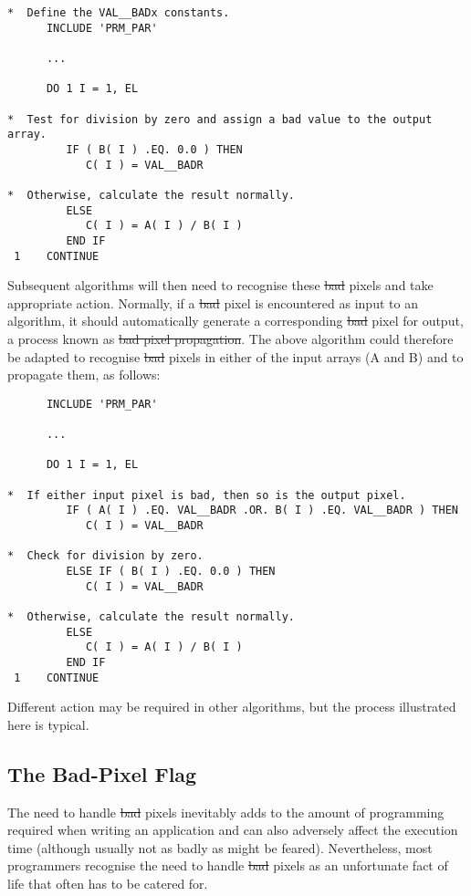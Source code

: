 \small
\begin{verbatim}
*  Define the VAL__BADx constants.
      INCLUDE 'PRM_PAR'

      ...

      DO 1 I = 1, EL

*  Test for division by zero and assign a bad value to the output array.
         IF ( B( I ) .EQ. 0.0 ) THEN
            C( I ) = VAL__BADR

*  Otherwise, calculate the result normally.
         ELSE
            C( I ) = A( I ) / B( I )
         END IF
 1    CONTINUE
\end{verbatim}
\normalsize

Subsequent algorithms will then need to recognise these \st{bad\/} pixels and
take appropriate action. 
Normally, if a \st{bad\/} pixel is encountered as input to an algorithm, it 
should automatically generate a corresponding \st{bad\/} pixel for output, a 
process known as \st{bad pixel propagation}.
The above algorithm could therefore be adapted to recognise \st{bad\/} pixels
in either of the input arrays (A and B) and to propagate them, as follows: 

\small
\begin{verbatim}
      INCLUDE 'PRM_PAR'

      ...

      DO 1 I = 1, EL

*  If either input pixel is bad, then so is the output pixel.
         IF ( A( I ) .EQ. VAL__BADR .OR. B( I ) .EQ. VAL__BADR ) THEN
            C( I ) = VAL__BADR

*  Check for division by zero.
         ELSE IF ( B( I ) .EQ. 0.0 ) THEN
            C( I ) = VAL__BADR

*  Otherwise, calculate the result normally.
         ELSE
            C( I ) = A( I ) / B( I )
         END IF
 1    CONTINUE
\end{verbatim}
\normalsize

Different action may be required in other algorithms, but the process
illustrated here is typical. 

\subsection{\label{ss:noexplicitchecks}The Bad-Pixel Flag}

The need to handle \st{bad\/} pixels inevitably adds to the amount of
programming required when writing an application and can also adversely
affect the execution time (although usually not as badly as might be
feared). 
Nevertheless, most programmers recognise the need to handle \st{bad\/} pixels
as an unfortunate fact of life that often has to be catered for. 

